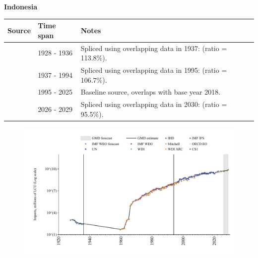 \documentclass[12pt,a4paper,landscape]{article}
\begin{document}
\begin{adjustbox}{max totalsize={\paperwidth}{\paperheight},center}
\begin{minipage}[t][\textheight][t]{\textwidth}
\vspace*{0.5cm}
{}
\begin{center}
{\Large\bfseries Indonesia}
\end{center}
\vspace{0.5cm}
\begin{table}[H]
\centering
\small
\begin{tabular}{|l|l|l|}
\hline
\textbf{Source} & \textbf{Time span} & \textbf{Notes} \\
\hline
\rowcolor{white}\cite{IHD}& 1928 - 1936 &Spliced using overlapping data in 1937: (ratio = 113.8\%).\\
\rowcolor{lightgray}\cite{WDI}& 1937 - 1994 &Spliced using overlapping data in 1995: (ratio = 106.7\%).\\
\rowcolor{white}\cite{OECD_EO}& 1995 - 2025 &Baseline source, overlaps with base year 2018.\\
\rowcolor{lightgray}\cite{IMF_WEO_forecast}& 2026 - 2029 &Spliced using overlapping data in 2030: (ratio = 95.5\%).\\
\hline
\end{tabular}
\end{table}
\begin{figure}[H]
\centering
\includegraphics[width=\textwidth,height=0.6\textheight,keepaspectratio]{graphs/IDN_imports.pdf}
\end{figure}
\end{minipage}
\end{adjustbox}
\end{document}
